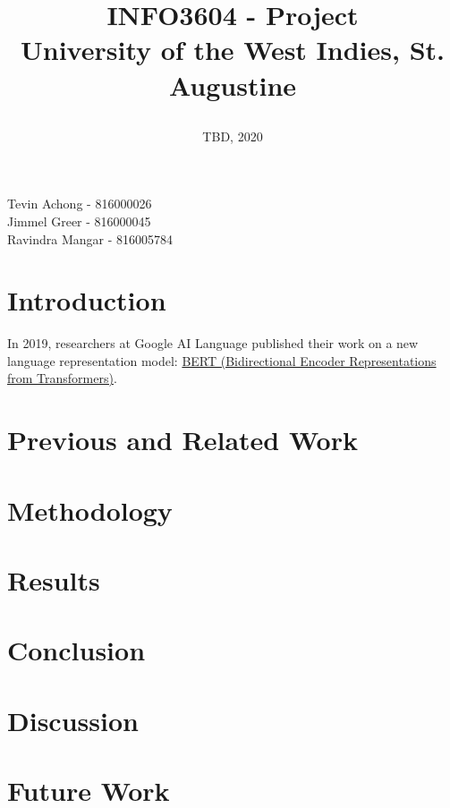 \documentclass[a4paper, 12pt]{article}
\begin{document}
\title{ 
		INFO3604 - Project\\
		University of the West Indies, St. Augustine
		\date{TBD, 2020}
}
\maketitle

\begin{center}
Tevin Achong - 816000026\\
Jimmel Greer - 816000045\\
Ravindra Mangar - 816005784
\end{center}

\newpage
\tableofcontents

\newpage
{}
\section{Introduction}
In 2019, researchers at Google AI Language published their work on a new language representation model: \href{https://arxiv.org/pdf/1810.04805.pdf}{BERT (Bidirectional Encoder Representations from Transformers)}.

\newpage
\section{Previous and Related Work}

\newpage
\section{Methodology}

\newpage
\section{Results}

\newpage
\section{Conclusion}

\newpage
\section{Discussion}

\newpage
\section{Future Work}
\end{document}
